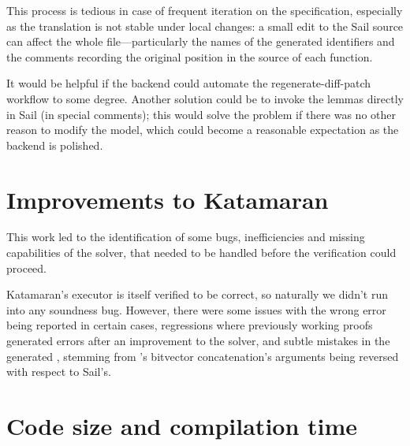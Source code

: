 This process is tedious in case of frequent iteration on the specification, especially as the translation is not stable under local changes: a small edit to the Sail source can affect the whole \usail file---particularly the names of the generated identifiers and the comments recording the original position in the source of each \usail function.

It would be helpful if the backend could automate the regenerate-diff-patch workflow to some degree. Another solution could be to invoke the lemmas directly in Sail (\eg in special comments); this would solve the problem if there was no other reason to modify the \usail model, which could become a reasonable expectation as the backend is polished.

\section{Improvements to Katamaran}

This work led to the identification of some bugs, inefficiencies and missing capabilities of the solver, that needed to be handled before the verification could proceed.

Katamaran's executor is itself verified to be correct, so naturally we didn't run into any soundness bug. However, there were some issues with the wrong error being reported in certain cases, regressions where previously working proofs generated errors after an improvement to the solver, and subtle mistakes in the generated \usail, stemming \eg from \usail's bitvector concatenation's arguments being reversed with respect to Sail's.

\section{Code size and compilation time}

